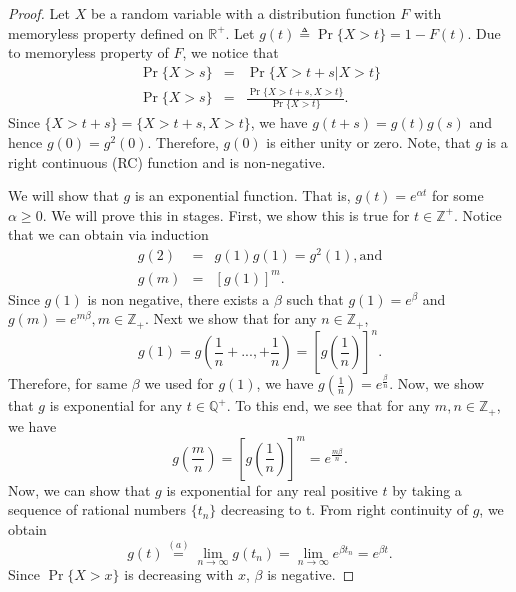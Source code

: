 \documentclass[a4paper,10pt]{article}
\begin{document}
\begin{proof}
Let $X$ be a random variable with a distribution function $F$ with memoryless property defined on $\mathbb{R}^{+}$. Let $g(t) \triangleq \Pr\{X > t\} = 1 - F(t)$. Due to memoryless property of $F$, we notice that
\begin{eqnarray*}
  \Pr\{X>s\} &=& \Pr\{ X > t+s| X>t\} \\
  \Pr\{X>s\} &=& \frac{ \Pr\{ X>t+s, X>t\}}{\Pr\{X>t\}}.
\end{eqnarray*}
Since $\{X > t + s\} =\{ X>t+s, X>t\}$, we have $g(t+s) = g(t)g(s)$ and hence $g(0) = g^2(0)$. Therefore, $g(0)$ is either unity or zero. Note, that $g$ is a right continuous (RC) function and is non-negative. 

We will show that $g$ is an exponential function. That is, $g(t) = e^{\alpha t}$ for some $\alpha \geqslant 0$. We will prove this in stages. First, we show this is true for $t \in \mathbb{Z}^+$. Notice that we can obtain via induction
\begin{eqnarray*}
	g(2) &=& g(1) g(1) = g^{2}(1), \mathrm{ and }\\
	g(m) &=& [g(1)]^{m}.
\end{eqnarray*}
Since $g(1)$ is non negative, there exists a $\beta$ such that $g(1)=e^{\beta}$ and $g(m)= e^{m \beta}, m \in \mathbb{Z}_{+}$. Next we show that for any $n \in \mathbb{Z}_{+}$,        
\begin{equation*}
	g(1) =  g\left(\frac{1}{n}+..., +\frac{1}{n}\right) = \left[g\left(\frac{1}{n}\right)\right]^{n}.
\end{equation*}
Therefore, for same $\beta$ we used for $g(1)$, we have $g\left(\frac{1}{n}\right) = e^{\frac{\beta}{n}}$. Now, we show that $g$ is exponential for any $t \in \mathbb{Q}^+$. To this end, we see that for any $m, n \in \mathbb{Z}_{+}$, we have 
\begin{equation*}
	g\left(\frac{m}{n}\right) = \left[g\left(\frac{1}{n}\right)\right]^{m}= e^{\frac{m \beta}{n}}.
\end{equation*}
Now, we can show that $g$ is exponential for any real positive $t$ by taking a sequence of rational numbers $\{t_n\}$ decreasing to t. From right continuity of $g$, we obtain 
\begin{equation*}
	g(t) \stackrel{(a)}{=} \lim_{n\rightarrow \infty} g(t_n) =   \lim_{n\rightarrow \infty} e^{\beta t_{n}}= e^{\beta t}.
\end{equation*}
Since $\Pr\{X > x\}$  is decreasing  with $x$, $\beta $ is negative.  
\end{proof}
\end{document}
